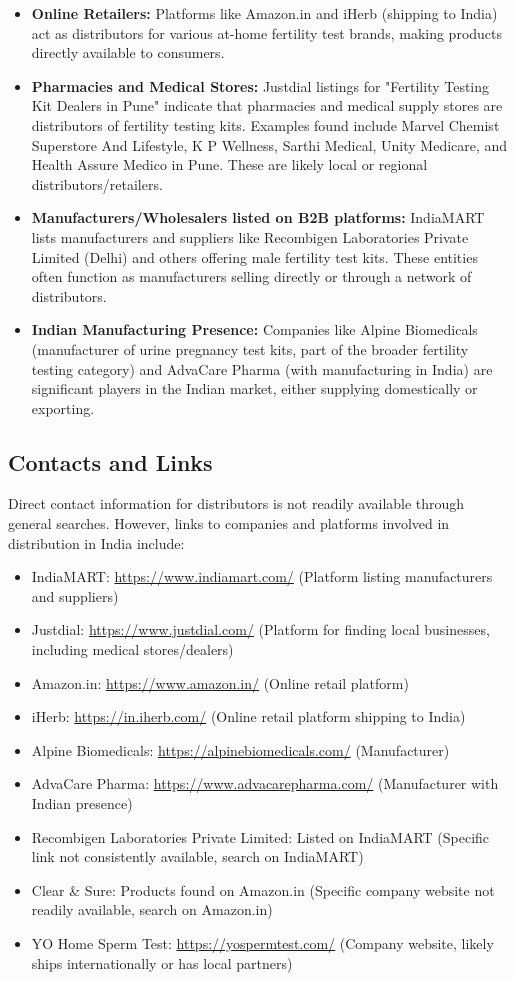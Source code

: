 \documentclass{article}
\begin{document}
\begin{itemize}
    \item \textbf{Online Retailers:} Platforms like Amazon.in and iHerb (shipping to India) act as distributors for various at-home fertility test brands, making products directly available to consumers.
    \item \textbf{Pharmacies and Medical Stores:} Justdial listings for "Fertility Testing Kit Dealers in Pune" indicate that pharmacies and medical supply stores are distributors of fertility testing kits. Examples found include Marvel Chemist Superstore And Lifestyle, K P Wellness, Sarthi Medical, Unity Medicare, and Health Assure Medico in Pune. These are likely local or regional distributors/retailers.
    \item \textbf{Manufacturers/Wholesalers listed on B2B platforms:} IndiaMART lists manufacturers and suppliers like Recombigen Laboratories Private Limited (Delhi) and others offering male fertility test kits. These entities often function as manufacturers selling directly or through a network of distributors.
    \item \textbf{Indian Manufacturing Presence:} Companies like Alpine Biomedicals (manufacturer of urine pregnancy test kits, part of the broader fertility testing category) and AdvaCare Pharma (with manufacturing in India) are significant players in the Indian market, either supplying domestically or exporting.
\end{itemize}

\subsection{Contacts and Links}
Direct contact information for distributors is not readily available through general searches. However, links to companies and platforms involved in distribution in India include:
\begin{itemize}
    \item IndiaMART: \url{https://www.indiamart.com/} (Platform listing manufacturers and suppliers)
    \item Justdial: \url{https://www.justdial.com/} (Platform for finding local businesses, including medical stores/dealers)
    \item Amazon.in: \url{https://www.amazon.in/} (Online retail platform)
    \item iHerb: \url{https://in.iherb.com/} (Online retail platform shipping to India)
    \item Alpine Biomedicals: \url{https://alpinebiomedicals.com/} (Manufacturer)
    \item AdvaCare Pharma: \url{https://www.advacarepharma.com/} (Manufacturer with Indian presence)
    \item Recombigen Laboratories Private Limited: Listed on IndiaMART (Specific link not consistently available, search on IndiaMART)
    \item Clear & Sure: Products found on Amazon.in (Specific company website not readily available, search on Amazon.in)
    \item YO Home Sperm Test: \url{https://yospermtest.com/} (Company website, likely ships internationally or has local partners)
\end{itemize}
\end{document}
